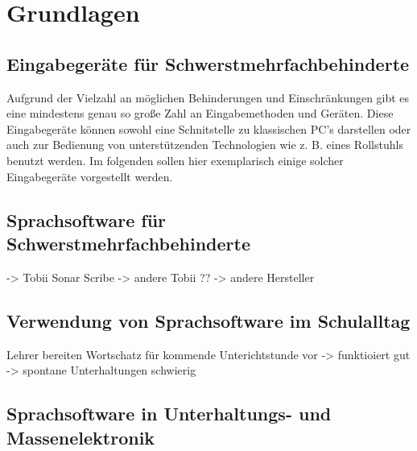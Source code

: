 \section{Grundlagen}

	\subsection{Eingabegeräte für Schwerstmehrfachbehinderte}
    \label{sec:input-devices}
    
    	Aufgrund der Vielzahl an möglichen Behinderungen und Einschränkungen gibt es eine mindestens genau so große Zahl an Eingabemethoden und Geräten. Diese Eingabegeräte können sowohl eine Schnitstelle zu klassischen PC's darstellen oder auch zur Bedienung von unterstützenden Technologien wie z. B. eines Rollstuhls benutzt werden. Im folgenden sollen hier exemplarisch einige solcher Eingabegeräte vorgestellt werden.
        
    \newpage
    \subsection{Sprachsoftware für Schwerstmehrfachbehinderte}
    
    -> Tobii Sonar Scribe
    -> andere Tobii ??
    -> andere Hersteller
    
    \subsection{Verwendung von Sprachsoftware im Schulalltag}
    
    Lehrer bereiten Wortschatz für kommende Unterichtstunde vor
    -> funktioiert gut
    -> spontane Unterhaltungen schwierig
    
	\subsection{Sprachsoftware in Unterhaltungs- und Massenelektronik}
    
    \newpage